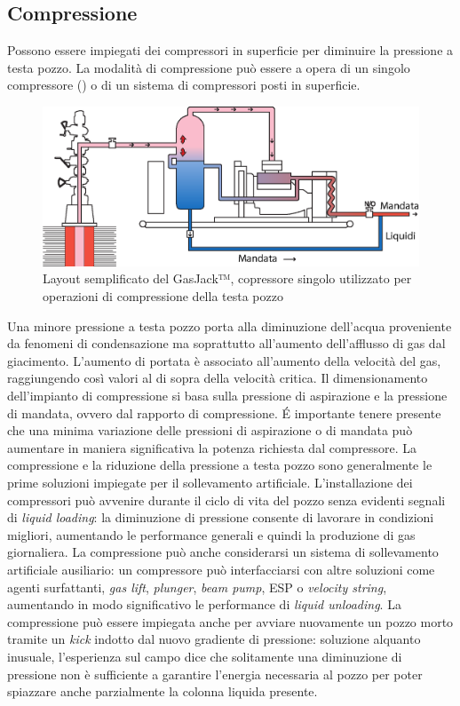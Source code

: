 \subsection{Compressione}
Possono essere impiegati dei compressori in superficie per diminuire la pressione a testa pozzo. La modalità di compressione può essere a opera di un singolo compressore () o di un sistema di compressori posti in superficie. 

\begin{figure}[htbp]
    \centering
    \includegraphics[width=\textwidth]{fig/foamer/compressore.eps}
    \caption{Layout semplificato del GasJack™, copressore singolo utilizzato per operazioni di compressione della testa pozzo \parencite{garner2009backside}}
    \label{fig:compressore}
\end{figure}

Una minore pressione a testa pozzo porta alla diminuzione dell'acqua proveniente da fenomeni di condensazione ma soprattutto all'aumento dell'afflusso di gas dal giacimento. L'aumento di portata è associato all'aumento della velocità del gas, raggiungendo così valori al di sopra della velocità critica. Il dimensionamento dell'impianto di compressione si basa sulla pressione di aspirazione e la pressione di mandata, ovvero dal rapporto di compressione. \'E importante tenere presente che una minima variazione delle pressioni di aspirazione o di mandata può aumentare in maniera significativa la potenza richiesta dal compressore. La compressione e la riduzione della pressione a testa pozzo sono generalmente le prime soluzioni impiegate per il sollevamento artificiale. L'installazione dei compressori può avvenire durante il ciclo di vita del pozzo senza evidenti segnali di \textit{liquid loading}: la diminuzione di pressione consente di lavorare in condizioni migliori, aumentando le performance generali e quindi la produzione di gas giornaliera. La compressione può anche considerarsi un sistema di sollevamento artificiale ausiliario: un compressore può interfacciarsi con altre soluzioni come agenti surfattanti, \textit{gas lift}, \textit{plunger}, \textit{beam pump}, ESP o \textit{velocity string}, aumentando in modo significativo le performance di \textit{liquid unloading}. La compressione può essere impiegata anche per avviare nuovamente un pozzo morto tramite un \textit{kick} indotto dal nuovo gradiente di pressione: soluzione alquanto inusuale, l'esperienza sul campo dice che solitamente una diminuzione di pressione non è sufficiente a garantire l'energia necessaria al pozzo per poter spiazzare anche parzialmente la colonna liquida presente.


